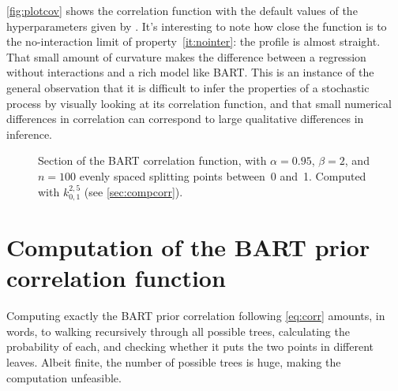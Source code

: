 \documentclass[a4paper]{article}
\theoremstyle{definition}
\newcommand{\widecenter}[1]{\noindent\hspace{-\textwidth}\makebox[3\textwidth][c]{#1}}
\newcommand{\includempl}[1]{\texttt{[image: \#1]}}
\begin{document}
    \autoref{fig:plotcov} shows the correlation function with the default values of the hyperparameters given by \textcite{chipman2010}. It's interesting to note how close the function is to the no-interaction limit of property~\ref{it:nointer}: the profile is almost straight. That small amount of curvature makes the difference between a regression without interactions and a rich model like BART. This is an instance of the general observation that it is difficult to infer the properties of a stochastic process by visually looking at its correlation function, and that small numerical differences in correlation can correspond to large qualitative differences in inference.
    \begin{figure}
        
        \widecenter{\includempl{plotcov}}
        
        \caption{\label{fig:plotcov} Section of the BART correlation function, with $\alpha=0.95$, $\beta=2$, and $n=100$ evenly spaced splitting points between~0 and~1. Computed with $k^{2,5}_{0,1}$ (see \autoref{sec:compcorr}).}
        
    \end{figure}
        
    \section{Computation of the BART prior correlation function}
    \label{sec:compcorr}
    
    Computing exactly the BART prior correlation following \autoref{eq:corr} amounts, in words, to walking recursively through all possible trees, calculating the probability of each, and checking whether it puts the two points in different leaves. Albeit finite, the number of possible trees is huge, making the computation unfeasible.
\end{document}
